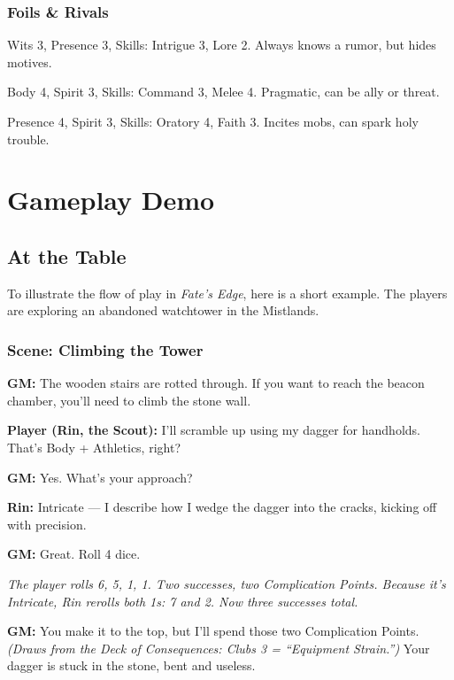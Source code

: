 \documentclass[11pt]{book}
\begin{document}
\subsection{Foils \& Rivals}
\begin{description}[leftmargin=2cm]
  \item[Ambitious Scribe] Wits 3, Presence 3, Skills: Intrigue 3, Lore 2. Always knows a rumor, but hides motives.  
  \item[Mercenary Captain] Body 4, Spirit 3, Skills: Command 3, Melee 4. Pragmatic, can be ally or threat.  
  \item[Flame Preacher] Presence 4, Spirit 3, Skills: Oratory 4, Faith 3. Incites mobs, can spark holy trouble.  
\end{description}

\chapter{Gameplay Demo}

\section*{At the Table}
To illustrate the flow of play in \textit{Fate’s Edge}, here is a short example.  
The players are exploring an abandoned watchtower in the Mistlands.  

\subsection*{Scene: Climbing the Tower}

\textbf{GM:} The wooden stairs are rotted through. If you want to reach the beacon chamber, you’ll need to climb the stone wall.  

\textbf{Player (Rin, the Scout):} I’ll scramble up using my dagger for handholds. That’s Body + Athletics, right?  

\textbf{GM:} Yes. What’s your approach?  

\textbf{Rin:} Intricate — I describe how I wedge the dagger into the cracks, kicking off with precision.  

\textbf{GM:} Great. Roll 4 dice.  

\textit{The player rolls 6, 5, 1, 1. Two successes, two Complication Points. Because it’s Intricate, Rin rerolls both 1s: 7 and 2. Now three successes total.}  

\textbf{GM:} You make it to the top, but I’ll spend those two Complication Points.  
\textit{(Draws from the Deck of Consequences: Clubs 3 = “Equipment Strain.”)}  
Your dagger is stuck in the stone, bent and useless.  
\end{document}
